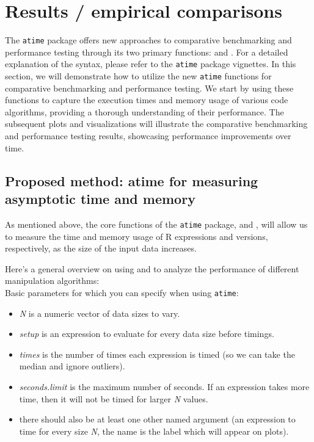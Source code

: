 \vspace{0.1in}

\section{Results / empirical comparisons}

\noindent The \texttt{atime} package offers new approaches to comparative benchmarking and performance testing through its two primary functions:  and . For a detailed explanation of the syntax, please refer to the \texttt{atime} package vignettes. In this section, we will demonstrate how to utilize the new \texttt{atime} functions for comparative benchmarking and performance testing. We start by using these functions to capture the execution times and memory usage of various code algorithms, providing a thorough understanding of their performance. The subsequent plots and visualizations will illustrate the comparative benchmarking and performance testing results, showcasing performance improvements over time.\\

\subsection{Proposed method: atime for measuring asymptotic time and memory}

\noindent As mentioned above, the core functions of the \texttt{atime} package,  and , will allow us to measure the time and memory usage of R expressions and versions, respectively, as the size of the input data increases.

\noindent Here's a general overview on using  and  to analyze the performance of different manipulation algorithms:\\

\noindent Basic parameters for which you can specify when using \texttt{atime}:

\begin{itemize}
 \item \textit{N} is a numeric vector of data sizes to vary.
  \item \textit{setup} is an expression to evaluate for every data size before timings.
  \item \textit{times} is the number of times each expression is timed (so we can take the median and ignore outliers).
  \item \textit{seconds.limit} is the maximum number of seconds. If an expression takes more time, then it will not be timed for larger \textit{N} values.
  \item there should also be at least one other named argument (an expression to time for every size \textit{N}, the name is the label which will appear on plots).
 
\end{itemize}

